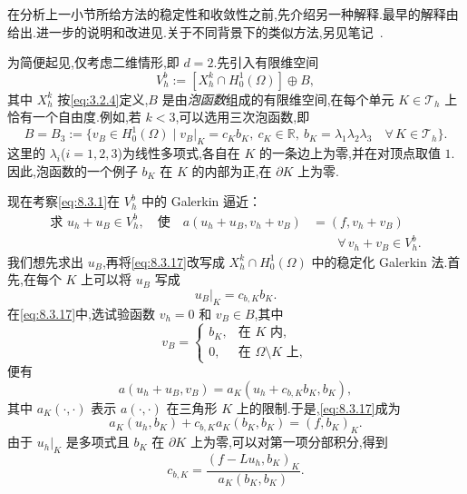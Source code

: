 在分析上一小节所给方法的稳定性和收敛性之前,先介绍另一种解释.最早的解释由给出.进一步的说明和改进见.关于不同背景下的类似方法,另见笔记~.

为简便起见,仅考虑二维情形,即 \(d=2\).先引入有限维空间
\begin{equation}\label{eq:8.3.15}
  V_h^b:=[X_h^k\cap H_0^1(\Omega)]\oplus B,
\end{equation}
其中 \(X_h^k\) 按\eqref{eq:3.2.4}定义,\(B\) 是由\emph{泡函数}组成的有限维空间,在每个单元 \(K\in\mathcal T_h\) 上恰有一个自由度.例如,若 \(k<3\),可以选用三次泡函数,即
\begin{equation}\label{eq:8.3.16}
  B=B_3:=\{v_B\in H_0^1(\Omega)\mid
       v_B|_K=c_Kb_K,\ c_K\in\mathbb R,\ b_K=\lambda_1\lambda_2\lambda_3
       \quad\forall\,K\in\mathcal T_h\}.
\end{equation}
这里的 \(\lambda_i\)(\(i=1,2,3\))为线性多项式,各自在 \(K\) 的一条边上为零,并在对顶点取值 \(1\).因此,泡函数的一个例子 \(b_K\) 在 \(K\) 的内部为正,在 \(\partial K\) 上为零.

现在考察\eqref{eq:8.3.1}在 \(V_h^b\) 中的 Galerkin 逼近：
\begin{equation}\label{eq:8.3.17}
  \begin{aligned}
    \text{求 }u_h+u_B\in V_h^b,\quad\text{使}\quad
      a(u_h+u_B,v_h+v_B)&=(f,v_h+v_B)\\
      &\qquad\forall\,v_h+v_B\in V_h^b.
  \end{aligned}
\end{equation}
我们想先求出 \(u_B\),再将\eqref{eq:8.3.17}改写成 \(X_h^k\cap H_0^1(\Omega)\) 中的稳定化 Galerkin 法.首先,在每个 \(K\) 上可以将 \(u_B\) 写成
\begin{equation}\label{eq:8.3.18}
  u_B|_K=c_{b,K}b_K.
\end{equation}
在\eqref{eq:8.3.17}中,选试验函数 \(v_h=0\) 和 \(v_B\in B\),其中
\[
  v_B=
  \begin{cases}
    b_K,&\text{在 }K\text{ 内},\\
    0,&\text{在 }\Omega\setminus K\text{ 上},
  \end{cases}
\]
便有
\[
  a(u_h+u_B,v_B)=a_K(u_h+c_{b,K}b_K,b_K),
\]
其中 \(a_K(\cdot,\cdot)\) 表示 \(a(\cdot,\cdot)\) 在三角形 \(K\) 上的限制.于是,\eqref{eq:8.3.17}成为
\[
  a_K(u_h,b_K)+c_{b,K}a_K(b_K,b_K)=(f,b_K)_K.
\]
由于 \(u_h|_K\) 是多项式且 \(b_K\) 在 \(\partial K\) 上为零,可以对第一项分部积分,得到
\begin{equation}\label{eq:8.3.19}
  c_{b,K}=\frac{(f-Lu_h,b_K)_K}{a_K(b_K,b_K)}.
\end{equation}


